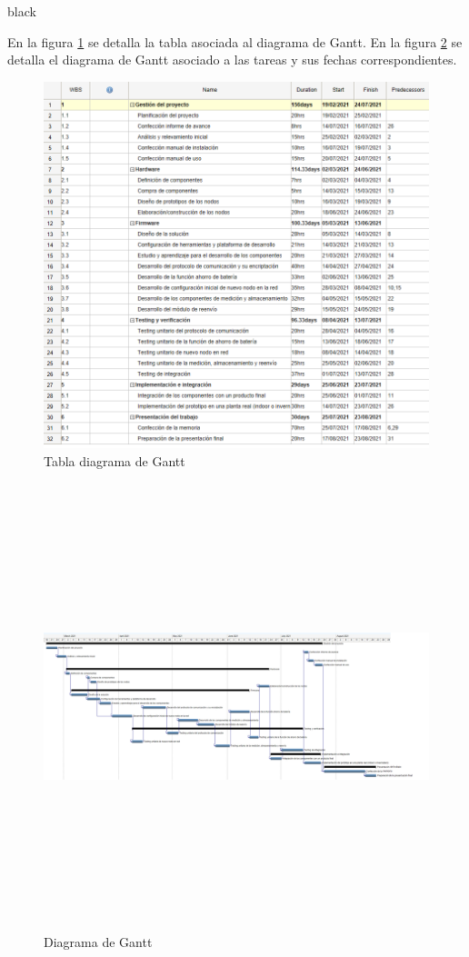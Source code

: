 \documentclass[11pt]{charter}
\begin{document}
\begin{consigna}{black}

En la figura \ref{fig:wbs} se detalla la tabla asociada al diagrama de Gantt. En la figura \ref{fig:g1} se detalla el diagrama de Gantt asociado a las tareas y sus fechas correspondientes.

\begin{figure}[htpb]
\centering 
\includegraphics[width=18cm]{./Figuras/wbs.png}
\caption{Tabla diagrama de Gantt}
\label{fig:wbs}
\end{figure}

\begin{landscape}
\begin{figure}[htpb]
\centering 
\includegraphics[width=25cm,height=13cm]{./Figuras/calendar.png}
\caption{Diagrama de Gantt}
\label{fig:g1}
\end{figure}
\end{landscape}


\end{consigna}
\end{document}
